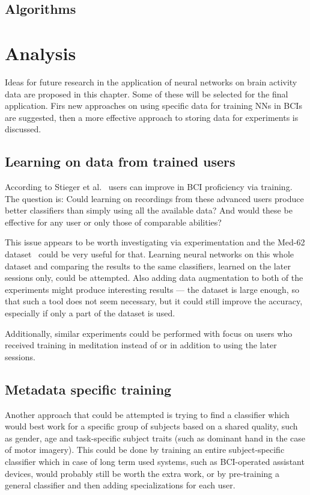 \documentclass[english, he, bc, kiv, iso690alph]{fasthesis}
\begin{document}
\section{Algorithms}


\chapter{Analysis}

Ideas for future research in the application of neural networks on brain activity data are proposed in this chapter. Some of these will be selected for the final application. Firs new approaches on using specific data for training NNs in BCIs are suggested, then a more effective approach to storing data for experiments is discussed.

\section{Learning on data from trained users}

According to Stieger et al.~\cite{data:stieger:21,stieger:mindfulness:20} users can improve in BCI proficiency via training. The question is: Could learning on recordings from these advanced users produce better classifiers than simply using all the available data? And would these be effective for any user or only those of comparable abilities?

This issue appears to be worth investigating via experimentation and the Med-62 dataset~\cite{data:stieger:21} could be very useful for that. Learning neural networks on this whole dataset and comparing the results to the same classifiers, learned on the later sessions only, could be  attempted. Also adding data augmentation to both of the experiments might produce interesting results --- the dataset is large enough, so that such a tool does not seem necessary, but it could still improve the accuracy, especially if only a part of the dataset is used.

Additionally, similar experiments could be performed with focus on users who received training in meditation instead of or in addition to using the later sessions.

\section{Metadata specific training}

Another approach that could be attempted is trying to find a classifier which would best work for a specific group of subjects based on a shared quality, such as gender, age and task-specific subject traits (such as dominant hand in the case of motor imagery). This could be done by training an entire subject-specific classifier which in case of long term used systems, such as BCI-operated assistant devices, would probably still be worth the extra work, or by pre-training a general classifier and then adding specializations for each user.
\end{document}
